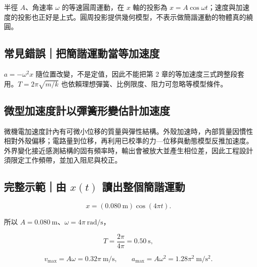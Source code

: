 \documentclass[11pt,a4paper]{article}
\begin{document}
半徑 \(A\)、角速率 \(\omega\) 的等速圓周運動，在 \(x\) 軸的投影為 \(x=A\cos\omega t\)；速度與加速度的投影也正好是上式。圓周投影提供幾何模型，不表示做簡諧運動的物體真的繞圓。

\subsection{常見錯誤｜把簡諧運動當等加速度}\label{ux5e38ux898bux932fux8aa4ux628aux7c21ux8ae7ux904bux52d5ux7576ux7b49ux52a0ux901fux5ea6}

\(a=-\omega^2x\) 隨位置改變，不是定值，因此不能把第 2 章的等加速度三式跨整段套用。\(T=2\pi\sqrt{m/k}\) 也依賴理想彈簧、比例限度、阻力可忽略等模型條件。

\subsection{微型加速度計以彈簧形變估計加速度}\label{ux5faeux578bux52a0ux901fux5ea6ux8a08ux4ee5ux5f48ux7c27ux5f62ux8b8aux4f30ux8a08ux52a0ux901fux5ea6}

微機電加速度計內有可微小位移的質量與彈性結構。外殼加速時，內部質量因慣性相對外殼偏移；電路量到位移，再利用已校準的力---位移與動態模型反推加速度。外界變化接近感測結構的固有頻率時，輸出會被放大並產生相位差，因此工程設計須限定工作頻帶，並加入阻尼與校正。

\begin{HandoutWorkedExample}

\subsection{\texorpdfstring{完整示範｜由 \(x(t)\) 讀出整個簡諧運動}{完整示範｜由 x(t) 讀出整個簡諧運動}}\label{ux5b8cux6574ux793aux7bc4ux7531-xt-ux8b80ux51faux6574ux500bux7c21ux8ae7ux904bux52d5}

\[
x=(0.080\ \mathrm m)\cos(4\pi t).
\]

所以 \(A=0.080\ \mathrm m\)、\(\omega=4\pi\ \mathrm{rad/s}\)，

\[
T=\frac{2\pi}{4\pi}=0.50\ \mathrm s,
\]

\[
v_{\max}=A\omega=0.32\pi\ \mathrm{m/s},
\qquad
a_{\max}=A\omega^2=1.28\pi^2\ \mathrm{m/s^2}.
\]

\end{HandoutWorkedExample}
\end{document}
